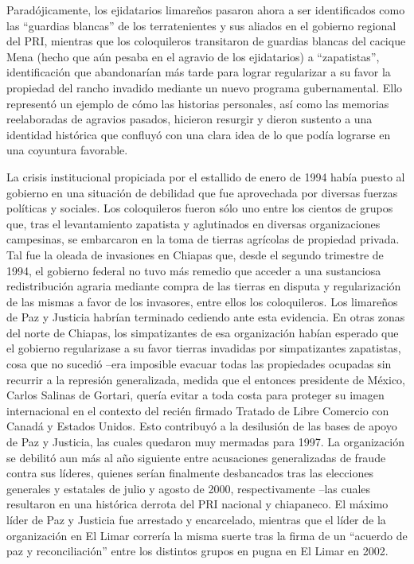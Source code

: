 \documentclass[
  spanish,
  11pt,
  a4paper,
]{scrbook}
\begin{document}
Paradójicamente, los ejidatarios limareños pasaron ahora a ser
identificados como las ``guardias blancas'' de los terratenientes y sus
aliados en el gobierno regional del PRI, mientras que los coloquileros
transitaron de guardias blancas del cacique Mena (hecho que aún pesaba
en el agravio de los ejidatarios) a ``zapatistas'', identificación que
abandonarían más tarde para lograr regularizar a su favor la propiedad
del rancho invadido mediante un nuevo programa gubernamental. Ello
representó un ejemplo de cómo las historias personales, así como las
memorias reelaboradas de agravios pasados, hicieron resurgir y dieron
sustento a una identidad histórica que confluyó con una clara idea de lo
que podía lograrse en una coyuntura favorable.

La crisis institucional propiciada por el estallido de enero de 1994
había puesto al gobierno en una situación de debilidad que fue
aprovechada por diversas fuerzas políticas y sociales. Los coloquileros
fueron sólo uno entre los cientos de grupos que, tras el levantamiento
zapatista y aglutinados en diversas organizaciones campesinas, se
embarcaron en la toma de tierras agrícolas de propiedad privada. Tal fue
la oleada de invasiones en Chiapas que, desde el segundo trimestre de
1994, el gobierno federal no tuvo más remedio que acceder a una
sustanciosa redistribución agraria mediante compra de las tierras en
disputa y regularización de las mismas a favor de los invasores, entre
ellos los coloquileros. Los limareños de Paz y Justicia habrían
terminado cediendo ante esta evidencia. En otras zonas del norte de
Chiapas, los simpatizantes de esa organización habían esperado que el
gobierno regularizase a su favor tierras invadidas por simpatizantes
zapatistas, cosa que no sucedió --era imposible evacuar todas las
propiedades ocupadas sin recurrir a la represión generalizada, medida
que el entonces presidente de México, Carlos Salinas de Gortari, quería
evitar a toda costa para proteger su imagen internacional en el contexto
del recién firmado Tratado de Libre Comercio con Canadá y Estados
Unidos. Esto contribuyó a la desilusión de las bases de apoyo de Paz y
Justicia, las cuales quedaron muy mermadas para 1997. La organización se
debilitó aun más al año siguiente entre acusaciones generalizadas de
fraude contra sus líderes, quienes serían finalmente desbancados tras
las elecciones generales y estatales de julio y agosto de 2000,
respectivamente --las cuales resultaron en una histórica derrota del PRI
nacional y chiapaneco. El máximo líder de Paz y Justicia fue arrestado y
encarcelado, mientras que el líder de la organización en El Limar
correría la misma suerte tras la firma de un ``acuerdo de paz y
reconciliación'' entre los distintos grupos en pugna en El Limar en
2002.
\end{document}
